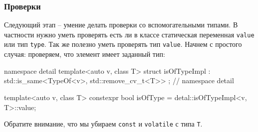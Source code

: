 \subsubsection{Проверки}
\label{section::LogicChecks}

Следующий этап -- умение делать проверки со вспомогательными типами.
В частности нужно уметь проверять есть ли в классе статическая переменная \verb"value" или тип \verb"type".
Так же полезно уметь проверять тип \verb"value".
Начнем с простого случая: проверяем, что элемент имеет заданный тип:
\begin{cppcode}
namespace detail {
template<auto v, class T>
struct isOfTypeImpl : std::is_same<TypeOf<v>, std::remove_cv_t<T>> {};
} // namespace detail

template<auto v, class T>
constexpr bool isOfType = detal::isOfTypeImpl<v, T>::value;
\end{cppcode}
Обратите внимание, что мы убираем \verb"const" и \verb"volatile" с типа \verb"T".

